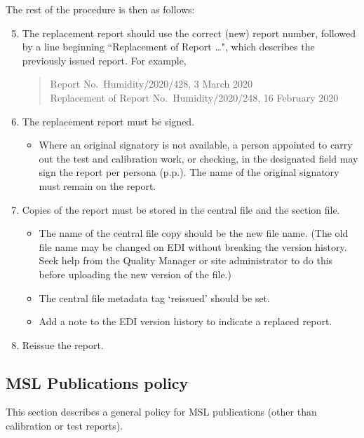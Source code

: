 The rest of the procedure is then as follows: 
\begin{enumerate}
\setcounter{enumi}{4}
\item The replacement report should use the correct (new) report number, followed by a line beginning ``Replacement of Report \ldots", which describes the previously issued report. For example, 
\begin{quote}
Report No.\ Humidity/2020/428, 3 March 2020\\
 Replacement of Report No.\ Humidity/2020/248, 16 February 2020
\end{quote}

\item The replacement report must be signed.
\begin{itemize}
\item Where an original signatory is not available, a person appointed to carry out the test and calibration work, or checking, in the designated field may sign the report per persona (p.p.).  The name of the original signatory must remain on the report.
\end{itemize}

\item Copies of the report must be stored in the central file and the section file.
\begin{itemize}
\item The name of the central file copy should be the new file name. (The old file name may be changed on EDI without breaking the version history. Seek help from the Quality Manager or site administrator to do this before uploading the new version of the file.) 
\item The central file metadata tag `reissued' should be set.
\item Add a note to the EDI version history to indicate a replaced report.
\end{itemize}
\item Reissue the report.

\end{enumerate}



\subsection{MSL Publications policy}
\label{ss:msl_publications_policy}

This section describes a general policy for MSL publications (other than calibration or test reports). 

